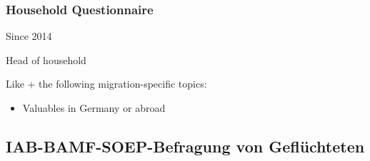 \documentclass[letterpaper,10pt,openany,onesideH,english]{sphinxmanual}
\begin{document}
\subsubsection{Household Questionnaire}
\label{\detokenize{Contents of SOEPcore/index:id30}}
 Since 2014

 Head of household


Like {\hyperref[\detokenize{Contents of SOEPcore/index:household-questionnaire}]{}} + the following migration-specific topics:
\begin{itemize}
\item {} 
Valuables in Germany or abroad

\end{itemize}


\subsection{IAB-BAMF-SOEP-Befragung von Geflüchteten}
\label{\detokenize{Contents of SOEPcore/index:iab-bamf-soep-befragung-von-gefluchteten}}
\end{document}
